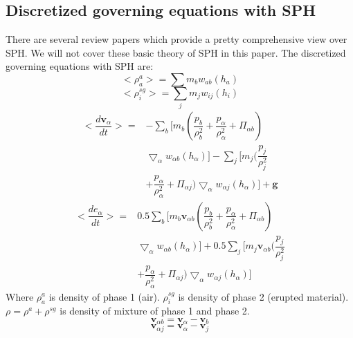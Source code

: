 \documentclass[conference,compsoc]{IEEEtran}
\begin{document}
\subsection{Discretized governing equations with SPH}
There are several review papers \cite{monaghan1992smoothed, monaghan2005smoothed, price2012smoothed, rosswog2009astrophysical, monaghan2012smoothed} which provide a pretty comprehensive view over SPH. We will not cover these basic theory of SPH in this paper.
The discretized governing equations with SPH are:
\begin{equation}
<\rho_a^a>=\sum m_b w_{ab} (h_a) \label{eq:gov-sph-d1}
\end{equation}
\begin{equation}
<\rho_i^{sg}>=\sum_j m_j w_{ij} (h_i) \label{eq:gov-sph-d2}
\end{equation}
\begin{equation}
\begin{split}
<\dfrac{d \textbf{v}_{\alpha}}{d t}>= &
-\sum_b [m_b (\dfrac{p_b}{\rho_b^2} + \dfrac{p_{\alpha}}{\rho_{\alpha}^2} + \Pi_{\alpha b}) \\ &\bigtriangledown_{\alpha}w_{\alpha b}(h_{\alpha})]
-\sum_j [m_j (\dfrac{p_j}{\rho_j^2} \\ & + \dfrac{p_{\alpha}}{\rho_{\alpha}^2} + \Pi_{\alpha j}) \bigtriangledown_{\alpha}w_{\alpha j}(h_{\alpha})]
+\textbf{g}
\end{split} 
\label{eq:gov-sph-v}
\end{equation}
\begin{equation}
\begin{split}
<\dfrac{d e_{\alpha}}{d t}>=&
 0.5\sum_b [m_b \textbf{v}_{\alpha b}(\dfrac{p_b}{\rho_b^2} + \dfrac{p_{\alpha}}{\rho_{\alpha}^2} + \Pi_{\alpha b})\\ & \bigtriangledown_{\alpha}w_{\alpha b}(h_{\alpha})]
+0.5\sum_j [m_j \textbf{v}_{\alpha b}(\dfrac{p_j}{\rho_j^2} \\ & + \dfrac{p_{\alpha}}{\rho_{\alpha}^2} + \Pi_{\alpha j}) \bigtriangledown_{\alpha}w_{\alpha j}(h_{\alpha})]
\end{split} 
\label{eq:gov-sph-e}
\end{equation}
Where
$\rho_a^a$ is density of phase 1 (air).
$\rho_i^{sg}$ is density of phase 2 (erupted material).
$\rho=\rho^a + \rho^{sg}$ is density of mixture of phase 1 and phase 2.
\begin{equation}
\textbf{v}_{\alpha b}=\textbf{v}_{\alpha}-\textbf{v}_b
\end{equation}
\begin{equation}
\textbf{v}_{\alpha j}=\textbf{v}_{\alpha}-\textbf{v}_j
\end{equation}
\end{document}
